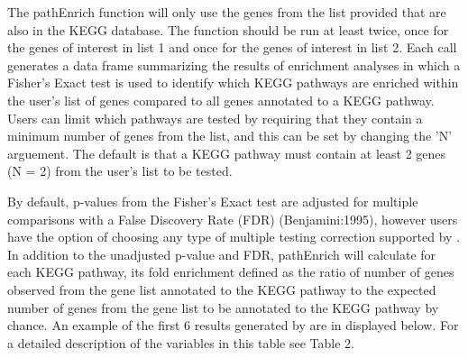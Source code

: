 \documentclass[article]{jss}\usepackage[]{graphicx}\usepackage[]{color}
\begin{document}
The pathEnrich function will only use the genes from the list provided that are
also in the KEGG database. The  function should be run at least
twice, once for the genes of interest in list 1 and once for the genes of
interest in list 2. Each  call generates a data frame
summarizing the results of enrichment analyses in which a Fisher’s Exact test is
used to identify which KEGG pathways are enriched within the user’s list of
genes compared to all genes annotated to a KEGG pathway. Users can limit which
pathways are tested by requiring that they contain a minimum number of genes
from the list, and this can be set by changing the 'N' arguement. The default is
that a KEGG pathway must contain at least 2 genes (N = 2) from the user’s list
to be tested.



By default, p-values from the Fisher’s Exact test are adjusted for multiple
comparisons with a False Discovery Rate (FDR) (Benjamini:1995), however users
have the option of choosing any type of multiple testing correction supported
by . In addition to the unadjusted p-value and FDR, pathEnrich
will calculate for each KEGG pathway, its fold enrichment defined as the ratio
of number of genes observed from the gene list annotated to the KEGG pathway to
the expected number of genes from the gene list to be annotated to the KEGG
pathway by chance. An example of the first 6 results generated by 
are in displayed below. For a detailed description of the variables in this table see Table 2.
\end{document}
